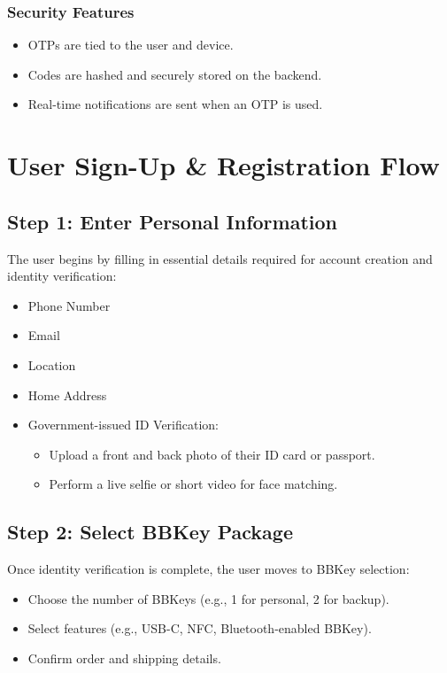 \documentclass{article}[12pt]
\begin{document}
\subsubsection*{Security Features}
\begin{itemize}
    \item OTPs are tied to the user and device.
    \item Codes are hashed and securely stored on the backend.
    \item Real-time notifications are sent when an OTP is used.
\end{itemize}

\section*{User Sign-Up \& Registration Flow}

\subsection*{Step 1: Enter Personal Information}
The user begins by filling in essential details required for account creation and identity verification:
\begin{itemize}
    \item Phone Number
    \item Email
    \item Location
    \item Home Address
    \item Government-issued ID Verification:
    \begin{itemize}
        \item Upload a front and back photo of their ID card or passport.
        \item Perform a live selfie or short video for face matching.
    \end{itemize}
\end{itemize}

\subsection*{Step 2: Select BBKey Package}
Once identity verification is complete, the user moves to BBKey selection:
\begin{itemize}
    \item Choose the number of BBKeys (e.g., 1 for personal, 2 for backup).
    \item Select features (e.g., USB-C, NFC, Bluetooth-enabled BBKey).
    \item Confirm order and shipping details.
\end{itemize}
\end{document}
